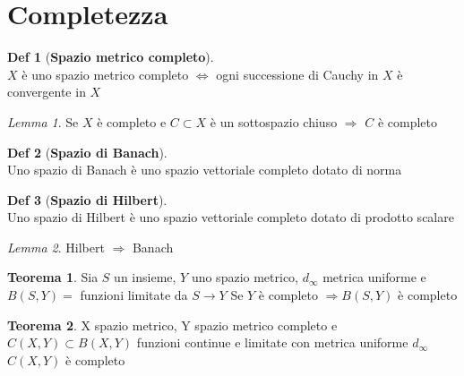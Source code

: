 \documentclass[a4paper,11pt]{report}
\theoremstyle{remark}
\newtheorem*{lemma}{Lemma}
\theoremstyle{definition}
\newtheorem*{teo}{Teorema}
\newtheorem*{Def}{Def}
\begin{document}
\section{Completezza}
\begin{Def}[\textbf{Spazio metrico completo}]\hfil\\
	$X$ è uno spazio metrico completo $\iff$ ogni successione di Cauchy in $X$ è convergente in $X$
\end{Def}
\begin{lemma}
	Se $X$ è completo e $C \subset X$ è un sottospazio chiuso $\Rightarrow$ $C$ è completo
\end{lemma}
\begin{Def}[\textbf{Spazio di Banach}]\hfil\\
	Uno spazio di Banach è uno spazio vettoriale completo dotato di norma
\end{Def}
\begin{Def}[\textbf{Spazio di Hilbert}]\hfill\\
	Uno spazio di Hilbert è uno spazio vettoriale completo dotato di prodotto scalare
\end{Def}
\begin{lemma}
	Hilbert $\Rightarrow$ Banach
\end{lemma}
\begin{teo}
	Sia $S$ un insieme, $Y$ uno spazio metrico, $d_\infty$ metrica uniforme e $B(S,Y) =$ funzioni limitate da $ S\to Y$ \newline
	Se $Y$ è completo $\Rightarrow B(S,Y)$ è completo  
\end{teo}
\begin{teo}
	X spazio metrico, Y spazio metrico completo e $C(X,Y) \subset B(X,Y)$ funzioni continue e limitate con metrica uniforme $d_\infty$ \newline
	$C(X,Y)$ è completo
\end{teo}
\end{document}
